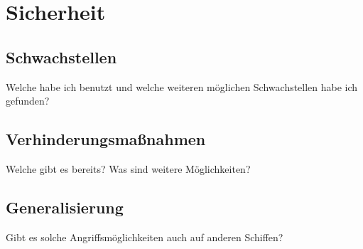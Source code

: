 \chapter{Sicherheit}

\section{Schwachstellen}
Welche habe ich benutzt und welche weiteren möglichen Schwachstellen habe ich gefunden?

\section{Verhinderungsmaßnahmen}
Welche gibt es bereits?
Was sind weitere Möglichkeiten?

\section{Generalisierung}
Gibt es solche Angriffsmöglichkeiten auch auf anderen Schiffen?